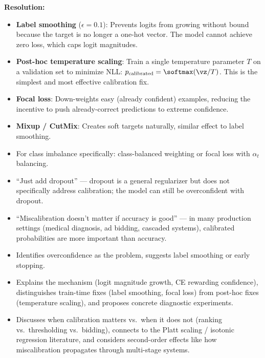 \begin{interviewq}
\textbf{Resolution:}
\begin{itemize}
    \item \textbf{Label smoothing} ($\epsilon = 0.1$): Prevents logits from growing without bound because the target is no longer a one-hot vector. The model cannot achieve zero loss, which caps logit magnitudes.
    \item \textbf{Post-hoc temperature scaling}: Train a single temperature parameter $T$ on a validation set to minimize NLL: $p_{\text{calibrated}} = \softmax(\vz / T)$. This is the simplest and most effective calibration fix.
    \item \textbf{Focal loss}: Down-weights easy (already confident) examples, reducing the incentive to push already-correct predictions to extreme confidence.
    \item \textbf{Mixup / CutMix}: Creates soft targets naturally, similar effect to label smoothing.
    \item For class imbalance specifically: class-balanced weighting or focal loss with $\alpha_t$ balancing.
\end{itemize}

\redflags
\begin{itemize}
    \item ``Just add dropout'' --- dropout is a general regularizer but does not specifically address calibration; the model can still be overconfident with dropout.
    \item ``Miscalibration doesn't matter if accuracy is good'' --- in many production settings (medical diagnosis, ad bidding, cascaded systems), calibrated probabilities are more important than accuracy.
\end{itemize}


\goodgreat
\begin{itemize}
    \item {} Identifies overconfidence as the problem, suggests label smoothing or early stopping.
    \item {} Explains the mechanism (logit magnitude growth, CE rewarding confidence), distinguishes train-time fixes (label smoothing, focal loss) from post-hoc fixes (temperature scaling), and proposes concrete diagnostic experiments.
    \item {} Discusses when calibration matters vs.\ when it does not (ranking vs.\ thresholding vs.\ bidding), connects to the Platt scaling / isotonic regression literature, and considers second-order effects like how miscalibration propagates through multi-stage systems.
\end{itemize}

\end{interviewq}

